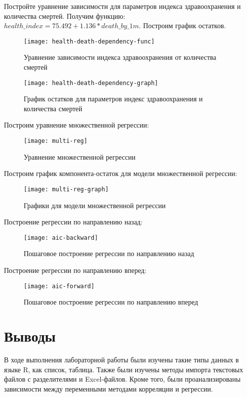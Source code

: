 \documentclass[a4paper,14pt]{extarticle}
\begin{document}
Постройте уравнение зависимости для параметров индекса здравоохранения и
количества смертей. Получим функцию: $health\_index = 75.492 + 1.136 *
death\_by\_1m$. Построим график остатков.
\begin{figure}[H]
    \centering
    \texttt{[image: health-death-dependency-func]}
    \caption{Уравнение зависимости индекса здравоохранения от количества смертей}
    \label{fig:health-death-dependency-func}
\end{figure}

\begin{figure}[H]
    \centering
    \texttt{[image: health-death-dependency-graph]}
    \caption{График остатков для параметров индекс здравоохранения и количества смертей}
    \label{fig:health-death-dependency-graph}
\end{figure}

Построим уравнение множественной регрессии:
\begin{figure}[H]
    \centering
    \texttt{[image: multi-reg]}
    \caption{Уравнение множественной регрессии}
    \label{fig:multi-reg}
\end{figure}

Построим график компонента-остаток для модели множественной регрессии:
\begin{figure}[H]
    \centering
    \texttt{[image: multi-reg-graph]}
    \caption{Графики для модели множественной регрессии}
    \label{fig:multi-reg-graph}
\end{figure}

Построение регрессии по направлению назад:
\begin{figure}[H]
    \centering
    \texttt{[image: aic-backward]}
    \caption{Пошаговое построение регрессии по направлению назад}
    \label{fig:aic-backward}
\end{figure}

Построение регрессии по направлению вперед:
\begin{figure}[H]
    \centering
    \texttt{[image: aic-forward]}
    \caption{Пошаговое построение регрессии по направлению вперед}
    \label{fig:aic-forward}
\end{figure}

\section*{Выводы}
В ходе выполнения лабораторной работы были изучены такие типы данных в языке R,
как список, таблица. Также были изучены методы импорта текстовых файлов с
разделителями и Excel-файлов. Кроме того, были проанализированы зависимости между
переменными методами корреляции и регрессии.
\end{document}
